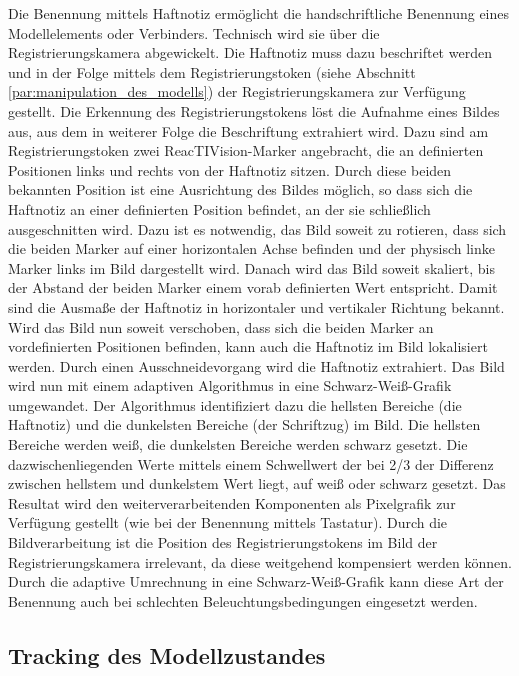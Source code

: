 Die Benennung mittels Haftnotiz ermöglicht die handschriftliche Benennung eines Modellelements oder Verbinders. Technisch wird sie über die Registrierungskamera abgewickelt. Die Haftnotiz muss dazu beschriftet werden und in der Folge mittels dem Registrierungstoken (siehe Abschnitt \ref{par:manipulation_des_modells}) der Registrierungskamera zur Verfügung gestellt. Die Erkennung des Registrierungstokens löst die Aufnahme eines Bildes aus, aus dem in weiterer Folge die Beschriftung extrahiert wird. Dazu sind am Registrierungstoken zwei ReacTIVision-Marker angebracht, die an definierten Positionen links und rechts von der Haftnotiz sitzen. Durch diese beiden bekannten Position ist eine Ausrichtung des Bildes möglich, so dass sich die Haftnotiz an einer definierten Position befindet, an der sie schließlich ausgeschnitten wird. Dazu ist es notwendig, das Bild soweit zu rotieren, dass sich die beiden Marker auf einer horizontalen Achse befinden und der physisch linke Marker links im Bild dargestellt wird. Danach wird das Bild soweit skaliert, bis der Abstand der beiden Marker einem vorab definierten Wert entspricht. Damit sind die Ausmaße der Haftnotiz in horizontaler und vertikaler Richtung bekannt. Wird das Bild nun soweit verschoben, dass sich die beiden Marker an vordefinierten Positionen befinden, kann auch die Haftnotiz im Bild lokalisiert werden. Durch einen Ausschneidevorgang wird die Haftnotiz extrahiert. Das Bild wird nun mit einem adaptiven Algorithmus in eine Schwarz-Weiß-Grafik umgewandet. Der Algorithmus identifiziert dazu die hellsten Bereiche (die Haftnotiz) und die dunkelsten Bereiche (der Schriftzug) im Bild. Die hellsten Bereiche werden weiß, die dunkelsten Bereiche werden schwarz gesetzt. Die dazwischenliegenden Werte mittels einem Schwellwert der bei 2/3 der Differenz zwischen hellstem und dunkelstem Wert liegt, auf weiß oder schwarz gesetzt. Das Resultat wird den weiterverarbeitenden Komponenten als Pixelgrafik zur Verfügung gestellt (wie bei der Benennung mittels Tastatur). Durch die Bildverarbeitung ist die Position des Registrierungstokens im Bild der Registrierungskamera irrelevant, da diese weitgehend kompensiert werden können. Durch die adaptive Umrechnung in eine Schwarz-Weiß-Grafik kann diese Art der Benennung auch bei schlechten Beleuchtungsbedingungen eingesetzt werden.


\subsection{Tracking des Modellzustandes} %
\label{sub:tracking_des_modellzustandes}

